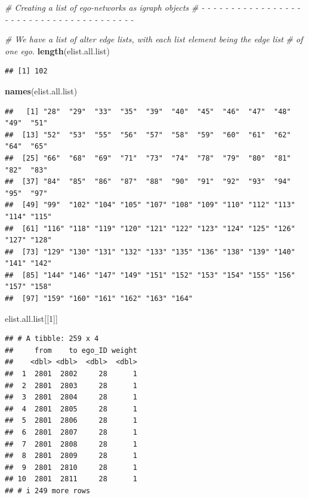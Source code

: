 \documentclass[
]{book}
\newenvironment{Shaded}{\begin{snugshade}}{\end{snugshade}}
\newcommand{\CommentTok}[1]{\textcolor[rgb]{0.56,0.35,0.01}{\textit{#1}}}
\newcommand{\DecValTok}[1]{\textcolor[rgb]{0.00,0.00,0.81}{#1}}
\newcommand{\FunctionTok}[1]{\textcolor[rgb]{0.13,0.29,0.53}{\textbf{#1}}}
\newcommand{\NormalTok}[1]{#1}
\begin{document}
\begin{Shaded}
\begin{Highlighting}[]
\CommentTok{\# Creating a list of ego{-}networks as igraph objects}
\CommentTok{\# {-} {-} {-} {-} {-} {-} {-} {-} {-} {-} {-} {-} {-} {-} {-} {-} {-} {-} {-} {-} {-} {-} {-} {-} {-} {-} {-} {-} {-} {-} {-} {-} {-} {-} {-} {-} {-} {-} {-}}

\CommentTok{\# We have a list of alter edge lists, with each list element being the edge list }
\CommentTok{\# of one ego.}
\FunctionTok{length}\NormalTok{(elist.all.list)}
\end{Highlighting}
\end{Shaded}

\begin{verbatim}
## [1] 102
\end{verbatim}

\begin{Shaded}
\begin{Highlighting}[]
\FunctionTok{names}\NormalTok{(elist.all.list)}
\end{Highlighting}
\end{Shaded}

\begin{verbatim}
##   [1] "28"  "29"  "33"  "35"  "39"  "40"  "45"  "46"  "47"  "48"  "49"  "51" 
##  [13] "52"  "53"  "55"  "56"  "57"  "58"  "59"  "60"  "61"  "62"  "64"  "65" 
##  [25] "66"  "68"  "69"  "71"  "73"  "74"  "78"  "79"  "80"  "81"  "82"  "83" 
##  [37] "84"  "85"  "86"  "87"  "88"  "90"  "91"  "92"  "93"  "94"  "95"  "97" 
##  [49] "99"  "102" "104" "105" "107" "108" "109" "110" "112" "113" "114" "115"
##  [61] "116" "118" "119" "120" "121" "122" "123" "124" "125" "126" "127" "128"
##  [73] "129" "130" "131" "132" "133" "135" "136" "138" "139" "140" "141" "142"
##  [85] "144" "146" "147" "149" "151" "152" "153" "154" "155" "156" "157" "158"
##  [97] "159" "160" "161" "162" "163" "164"
\end{verbatim}

\begin{Shaded}
\begin{Highlighting}[]
\NormalTok{elist.all.list[[}\DecValTok{1}\NormalTok{]]}
\end{Highlighting}
\end{Shaded}

\begin{verbatim}
## # A tibble: 259 x 4
##     from    to ego_ID weight
##    <dbl> <dbl>  <dbl>  <dbl>
##  1  2801  2802     28      1
##  2  2801  2803     28      1
##  3  2801  2804     28      1
##  4  2801  2805     28      1
##  5  2801  2806     28      1
##  6  2801  2807     28      1
##  7  2801  2808     28      1
##  8  2801  2809     28      1
##  9  2801  2810     28      1
## 10  2801  2811     28      1
## # i 249 more rows
\end{verbatim}
\end{document}
